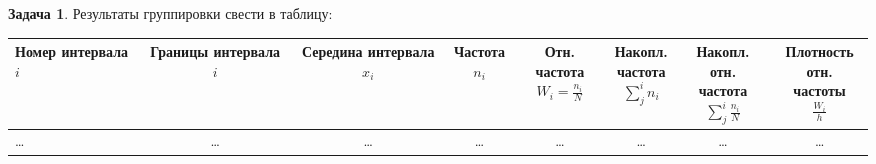 \documentclass[a4paper,11pt]{article}
\theoremstyle{definition}
\newtheorem{problem}{Задача}\setlength{\parindent}{0pt}
\begin{document}
\vspace{8pt}
\begin{problem}
    Результаты группировки свести в таблицу:

    \begin{table}[H]
        \centering
        \begin{adjustbox}{max width=\textwidth}
            \begin{tabular}{l c c c c c c c}
                \toprule
                    \makecell{Номер\\интервала \( i \)} & 
                    \makecell{Границы \\ интервала \( i \)} & 
                    \makecell{Середина\\интервала \( x_i \)} & 
                    \makecell{Частота\\\( n_i \)} & 
                    \makecell{Отн. частота\\\( W_i = \frac{n_i}{N} \)} & 
                    \makecell{Накопл.\\частота\\\( \sum^i_j n_i \)} & 
                    \makecell{Накопл. отн.\\частота\\\( \sum^i_j \frac{n_i}{N} \)} & 
                    \makecell{Плотность\\отн. частоты\\\( \frac{W_i}{h} \)} \\
                        \midrule
                            \dots & \dots & \dots & \dots & \dots & \dots & \dots & \dots \\
                        \bottomrule
            \end{tabular}
        \end{adjustbox}\label{tab:table2}
    \end{table}  


\end{problem}
\end{document}
